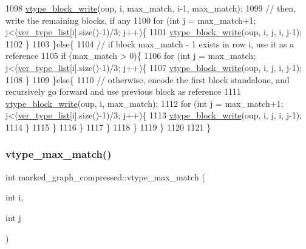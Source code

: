 \begin{DoxyCode}
1098           \hyperlink{classmarked__graph__compressed_a31f9ea72682f9072d0f90faf58a603fe}{vtype\_block\_write}(oup, i, max\_match, i-1, max\_match);
1099           \textcolor{comment}{// then, write the remaining blocks, if any}
1100           \textcolor{keywordflow}{for} (\textcolor{keywordtype}{int} j = max\_match+1; j<(\hyperlink{classmarked__graph__compressed_af2e3e55223d436628a02758dfae88493}{ver\_type\_list}[i].size()-1)/3; j++)\{
1101             \hyperlink{classmarked__graph__compressed_a31f9ea72682f9072d0f90faf58a603fe}{vtype\_block\_write}(oup, i, j, i, j-1);
1102           \}
1103         \}\textcolor{keywordflow}{else}\{
1104           \textcolor{comment}{// if block max\_match - 1 exists in row i, use it as a reference}
1105           \textcolor{keywordflow}{if} (max\_match > 0)\{
1106             \textcolor{keywordflow}{for} (\textcolor{keywordtype}{int} j = max\_match; j<(\hyperlink{classmarked__graph__compressed_af2e3e55223d436628a02758dfae88493}{ver\_type\_list}[i].size()-1)/3; j++)\{
1107               \hyperlink{classmarked__graph__compressed_a31f9ea72682f9072d0f90faf58a603fe}{vtype\_block\_write}(oup, i, j, i, j-1);
1108             \}
1109           \}\textcolor{keywordflow}{else}\{
1110             \textcolor{comment}{// otherwise, encode the first block standalone, and recursively go forward and use previous
       block as reference }
1111             \hyperlink{classmarked__graph__compressed_a31f9ea72682f9072d0f90faf58a603fe}{vtype\_block\_write}(oup, i, max\_match);
1112             \textcolor{keywordflow}{for} (\textcolor{keywordtype}{int} j = max\_match+1; j<(\hyperlink{classmarked__graph__compressed_af2e3e55223d436628a02758dfae88493}{ver\_type\_list}[i].size()-1)/3; j++)\{
1113               \hyperlink{classmarked__graph__compressed_a31f9ea72682f9072d0f90faf58a603fe}{vtype\_block\_write}(oup, i, j, i, j-1);
1114             \}
1115           \}
1116         \}
1117       \}
1118     \}
1119   \}
1120 
1121 \}
\end{DoxyCode}
\mbox{\label{classmarked__graph__compressed_a5ce51414e335d817f4be781fdcfbe9b1}} 
\subsubsection{\texorpdfstring{vtype\+\_\+max\+\_\+match()}{vtype\_max\_match()}}
{\footnotesize\ttfamily int marked\+\_\+graph\+\_\+compressed\+::vtype\+\_\+max\+\_\+match (\begin{DoxyParamCaption}\item[{int}]{i,  }\item[{int}]{j }\end{DoxyParamCaption})}



